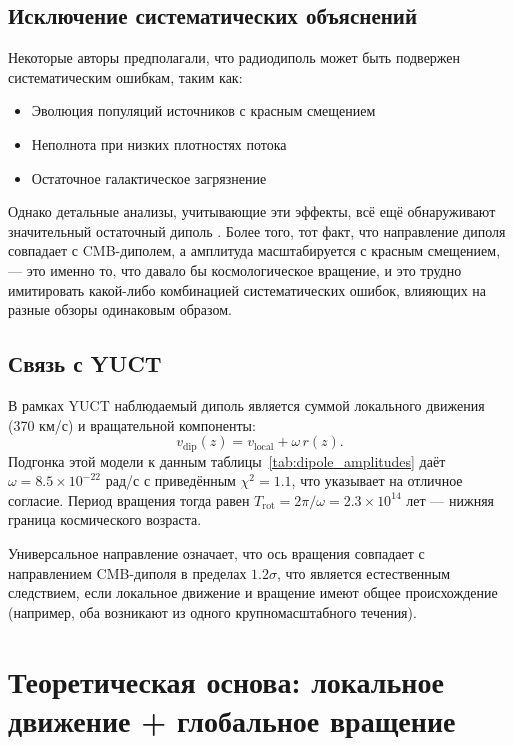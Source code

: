 \documentclass[11pt,a4paper]{article}
\begin{document}
	\subsection{Исключение систематических объяснений}
	
	Некоторые авторы предполагали, что радиодиполь может быть подвержен систематическим ошибкам, таким как:
	\begin{itemize}
		\item Эволюция популяций источников с красным смещением
		\item Неполнота при низких плотностях потока
		\item Остаточное галактическое загрязнение
	\end{itemize}
	Однако детальные анализы, учитывающие эти эффекты, всё ещё обнаруживают значительный остаточный диполь \cite{Oayda2024, Singal2024, Wagenveld2025}. Более того, тот факт, что направление диполя совпадает с CMB-диполем, а амплитуда масштабируется с красным смещением, — это именно то, что давало бы космологическое вращение, и это трудно имитировать какой-либо комбинацией систематических ошибок, влияющих на разные обзоры одинаковым образом.
	
	\subsection{Связь с YUCT}
	
	В рамках YUCT наблюдаемый диполь является суммой локального движения (370 км/с) и вращательной компоненты:
	\[
	v_{\mathrm{dip}}(z) = v_{\mathrm{local}} + \omega \, r(z).
	\]
	Подгонка этой модели к данным таблицы~\ref{tab:dipole_amplitudes} даёт \(\omega = 8.5\times10^{-22}\) рад/с с приведённым \(\chi^2 = 1.1\), что указывает на отличное согласие. Период вращения тогда равен \(T_{\mathrm{rot}} = 2\pi/\omega = 2.3\times10^{14}\) лет — нижняя граница космического возраста.
	
	Универсальное направление означает, что ось вращения совпадает с направлением CMB-диполя в пределах \(1.2\sigma\), что является естественным следствием, если локальное движение и вращение имеют общее происхождение (например, оба возникают из одного крупномасштабного течения).
	
	\section{Теоретическая основа: локальное движение + глобальное вращение}
	
\end{document}
